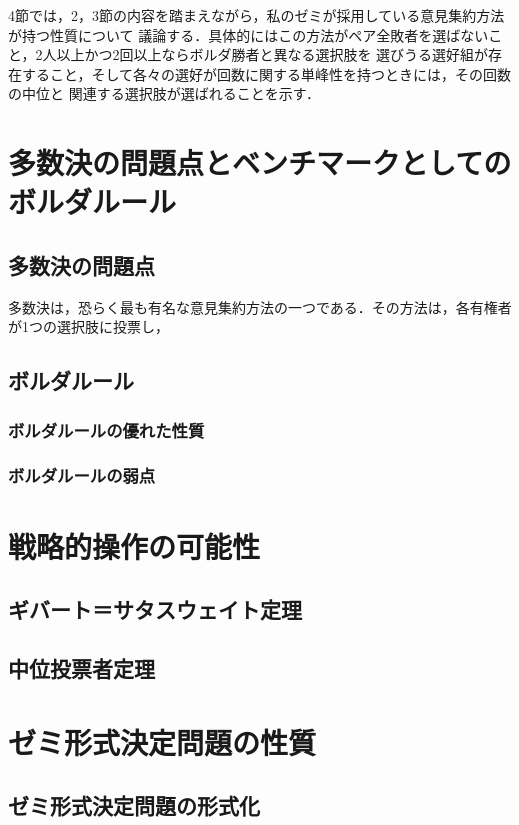 \documentclass[dvipdfmx]{jsarticle}
\begin{document}
4節では，2，3節の内容を踏まえながら，私のゼミが採用している意見集約方法が持つ性質について
議論する．具体的にはこの方法がペア全敗者を選ばないこと，2人以上かつ2回以上ならボルダ勝者と異なる選択肢を
選びうる選好組が存在すること，そして各々の選好が回数に関する単峰性を持つときには，その回数の中位と
関連する選択肢が選ばれることを示す．

\section{多数決の問題点とベンチマークとしてのボルダルール}
\subsection{多数決の問題点}
多数決は，恐らく最も有名な意見集約方法の一つである．その方法は，各有権者が1つの選択肢に投票し，


\subsection{ボルダルール}
\subsubsection{ボルダルールの優れた性質}
\subsubsection{ボルダルールの弱点}

\section{戦略的操作の可能性}

\subsection{ギバート＝サタスウェイト定理}
\subsection{中位投票者定理}

\section{ゼミ形式決定問題の性質}

\subsection{ゼミ形式決定問題の形式化}
\end{document}

